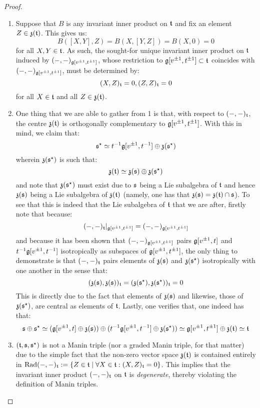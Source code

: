                 \begin{proof}
                    \begin{enumerate}
                        \item Suppose that $B$ is any invariant inner product on $\mathfrak{t}$ and fix an element $Z \in \mathfrak{z}(\mathfrak{t})$. This gives us:
                            $$B([X, Y], Z) = B(X, [Y, Z]) = B(X, 0) = 0$$
                        for all $X, Y \in \mathfrak{t}$. As such, the sought-for unique invariant inner product on $\mathfrak{t}$ induced by $(-, -)_{\mathfrak{g}[v^{\pm 1}, t^{\pm 1}]}$, whose restriction to $\mathfrak{g}[v^{\pm 1}, t^{\pm 1}] \subset \mathfrak{t}$ coincides with $(-, -)_{\mathfrak{g}[v^{\pm 1}, t^{\pm 1}]}$, must be determined by:
                            $$(X, Z)_{\mathfrak{t}} = 0, (Z, Z)_{\mathfrak{t}} = 0$$
                        for all $X \in \mathfrak{t}$ and all $Z \in \mathfrak{z}(\mathfrak{t})$.
                        \item One thing that we are able to gather from 1 is that, with respect to $(-, -)_{\mathfrak{t}}$, the centre $\mathfrak{z}(\mathfrak{t})$ is orthogonally complementary to $\mathfrak{g}[v^{\pm 1}, t^{\pm 1}]$. With this in mind, we claim that:
                            $$\mathfrak{s}^{\star} \simeq t^{-1}\mathfrak{g}[v^{\pm 1}, t^{-1}] \oplus \mathfrak{z}(\mathfrak{s}^{\star})$$
                        wherein $\mathfrak{z}(\mathfrak{s}^{\star})$ is such that:
                            $$\mathfrak{z}(\mathfrak{t}) \simeq \mathfrak{z}(\mathfrak{s}) \oplus \mathfrak{z}(\mathfrak{s}^{\star})$$
                        and note that $\mathfrak{z}(\mathfrak{s}^{\star})$ must exist due to $\mathfrak{s}$ being a Lie subalgebra of $\mathfrak{t}$ and hence $\mathfrak{z}(\mathfrak{s})$ being a Lie subalgebra of $\mathfrak{z}(\mathfrak{t})$ (namely, one has that $\mathfrak{z}(\mathfrak{s}) = \mathfrak{z}(\mathfrak{t}) \cap \mathfrak{s}$). To see that this is indeed that the Lie subalgebra of $\mathfrak{t}$ that we are after, firstly note that because:
                            $$(-, -)_{\mathfrak{t}}|_{\mathfrak{g}[v^{\pm 1}, t^{\pm 1}]} = (-, -)_{\mathfrak{g}[v^{\pm 1}, t^{\pm 1}]}$$
                        and because it has been shown that $(-, -)_{\mathfrak{g}[v^{\pm 1}, t^{\pm 1}]}$ pairs $\mathfrak{g}[v^{\pm 1}, t]$ and $t^{-1}\mathfrak{g}[v^{\pm 1}, t^{-1}]$ isotropically as subspaces of $\mathfrak{g}[v^{\pm 1}, t^{\pm 1}]$, the only thing to demonstrate is that $(-, -)_{\mathfrak{t}}$ pairs elements of $\mathfrak{z}(\mathfrak{s})$ and $\mathfrak{z}(\mathfrak{s}^{\star})$ isotropically with one another in the sense that:
                            $$(\mathfrak{z}(\mathfrak{s}), \mathfrak{z}(\mathfrak{s}))_{\mathfrak{t}} = (\mathfrak{z}(\mathfrak{s}^{\star}), \mathfrak{z}(\mathfrak{s}^{\star}))_{\mathfrak{t}} = 0$$
                        This is directly due to the fact that elements of $\mathfrak{z}(\mathfrak{s})$ and likewise, those of $\mathfrak{z}(\mathfrak{s}^{\star})$, are central as elements of $\mathfrak{t}$. Lastly, one verifies that, one indeed has that:
                            $$\mathfrak{s} \oplus \mathfrak{s}^{\star} \simeq ( \mathfrak{g}[v^{\pm 1}, t] \oplus \mathfrak{z}(\mathfrak{s}) ) \oplus ( t^{-1}\mathfrak{g}[v^{\pm 1}, t^{-1}] \oplus \mathfrak{z}(\mathfrak{s}^{\star}) ) \simeq \mathfrak{g}[v^{\pm 1}, t^{\pm 1}] \oplus \mathfrak{z}(\mathfrak{t}) \simeq \mathfrak{t}$$
                        \item $(\mathfrak{t}, \mathfrak{s}, \mathfrak{s}^{\star})$ is not a Manin triple (nor a graded Manin triple, for that matter) due to the simple fact that the non-zero vector space $\mathfrak{z}(\mathfrak{t})$ is contained entirely in $\operatorname{Rad} (-, -)_{\mathfrak{t}} := \{Z \in \mathfrak{t} \mid \forall X \in \mathfrak{t}: (X, Z)_{\mathfrak{t}} = 0\}$. This implies that the invariant inner product $(-, -)_{\mathfrak{t}}$ on $\mathfrak{t}$ is \textit{degenerate}, thereby violating the definition of Manin triples. 


\end{enumerate}
\end{proof}
